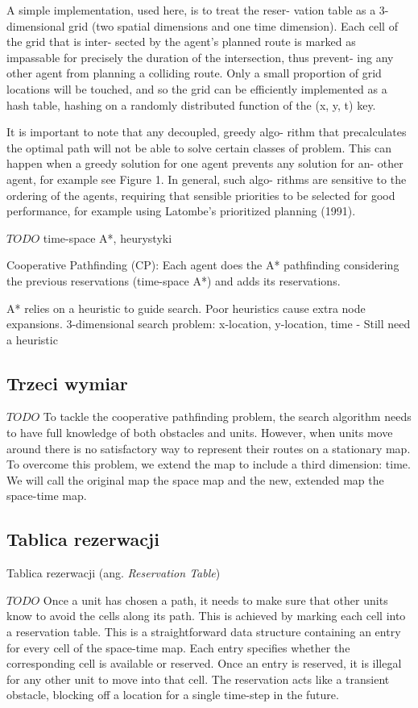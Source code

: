 A simple implementation, used here, is to treat the reser-
vation table as a 3-dimensional grid (two spatial dimensions
and one time dimension). Each cell of the grid that is inter-
sected by the agent’s planned route is marked as impassable
for precisely the duration of the intersection, thus prevent-
ing any other agent from planning a colliding route. Only a
small proportion of grid locations will be touched, and so the
grid can be efficiently implemented as a hash table, hashing
on a randomly distributed function of the (x, y, t) key.

It is important to note that any decoupled, greedy algo-
rithm that precalculates the optimal path will not be able to
solve certain classes of problem. This can happen when a
greedy solution for one agent prevents any solution for an-
other agent, for example see Figure 1. In general, such algo-
rithms are sensitive to the ordering of the agents, requiring
that sensible priorities to be selected for good performance,
for example using Latombe’s prioritized planning (1991).
\cite{cooppath}

$TODO$
time-space A*,
heurystyki

Cooperative Pathfinding (CP): Each agent does the A* pathfinding
considering the previous reservations (time-space A*) and adds its
reservations.

A* relies on a heuristic to guide search.
Poor heuristics cause extra node expansions.
3-dimensional search problem: x-location, y-location, time - Still need a heuristic

\subsection{Trzeci wymiar}
$TODO$
To tackle the cooperative pathfinding problem, the search algorithm needs to have full
knowledge of both obstacles and units. However, when units move around there is no
satisfactory way to represent their routes on a stationary map. To overcome this problem,
we extend the map to include a third dimension: time. We will call the original map the
space map and the new, extended map the space-time map.
\cite{cooppath}

\subsection{Tablica rezerwacji}
Tablica rezerwacji (ang. {\it Reservation Table})

$TODO$
Once a unit has chosen a path, it needs to make sure that other units know to avoid the
cells along its path. This is achieved by marking each cell into a reservation table. This is
a straightforward data structure containing an entry for every cell of the space-time map.
Each entry specifies whether the corresponding cell is available or reserved. Once an
entry is reserved, it is illegal for any other unit to move into that cell. The reservation acts
like a transient obstacle, blocking off a location for a single time-step in the future.

